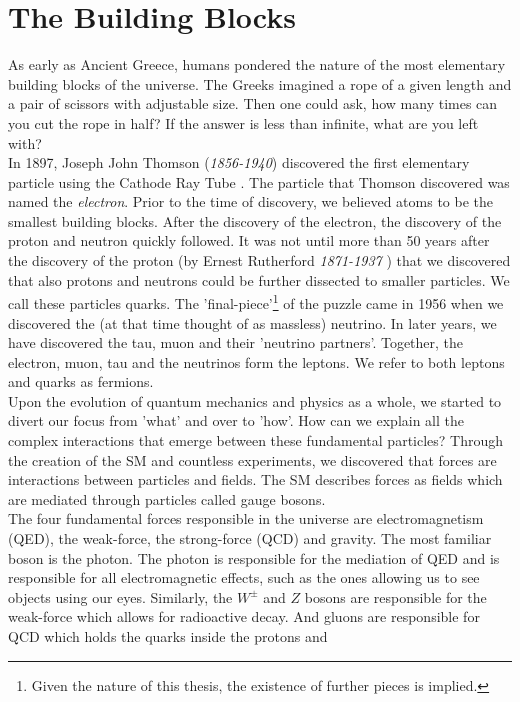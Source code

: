 \section{The Building Blocks}
As early as Ancient Greece, humans pondered the nature of the most elementary building blocks of
the universe. The Greeks imagined a rope of a given length and a pair of scissors with adjustable size.
Then one could ask, how many times can you cut the rope in half? If the answer is less than infinite,
what are you left with?
\\
In 1897, Joseph John Thomson (\emph{1856-1940}) discovered the first elementary particle using the Cathode Ray Tube \cite{JJ}. 
The particle that Thomson discovered was named the \emph{electron}. Prior to the time of discovery, we believed atoms to 
be the smallest building blocks. After the discovery of the electron, the discovery of the 
proton and neutron quickly followed. It was not until more than 50 years after the discovery of 
the proton (by Ernest Rutherford \emph{1871-1937} \cite{Rutherfoord}) that we discovered that also protons and neutrons 
could be further dissected to smaller particles. We call these particles quarks. The 'final-piece'\footnote{Given the
nature of this thesis, the existence of further pieces is implied.} of the puzzle came
in 1956 \cite{Reines} when we discovered the (at that time thought of as massless) neutrino. In 
later years, we have discovered the tau, muon and their 'neutrino partners'. Together, the 
electron, muon, tau and the neutrinos form the leptons. We refer to both leptons and quarks as fermions.
\\
Upon the evolution of quantum mechanics and physics as a whole, we started to divert
our focus from 'what' and over to 'how'. How can we explain all the complex interactions
that emerge between these fundamental particles? Through the creation of the \ac{SM} and countless 
experiments, we discovered that forces are interactions between particles and fields.
The \ac{SM} describes forces as fields which are mediated through particles called gauge bosons. 
\\
The four fundamental forces responsible in the universe are electromagnetism (\ac{QED}), the weak-force, 
the strong-force (\ac{QCD}) and gravity. The most familiar boson is the photon. The photon is responsible 
for the mediation of \ac{QED} and is responsible for all electromagnetic effects, such as the ones allowing
us to see objects using our eyes. Similarly, the $W^{\pm}$ and $Z$ bosons are responsible for the weak-force which
allows for radioactive decay. And gluons are responsible for \ac{QCD} which holds the quarks inside the protons and 
